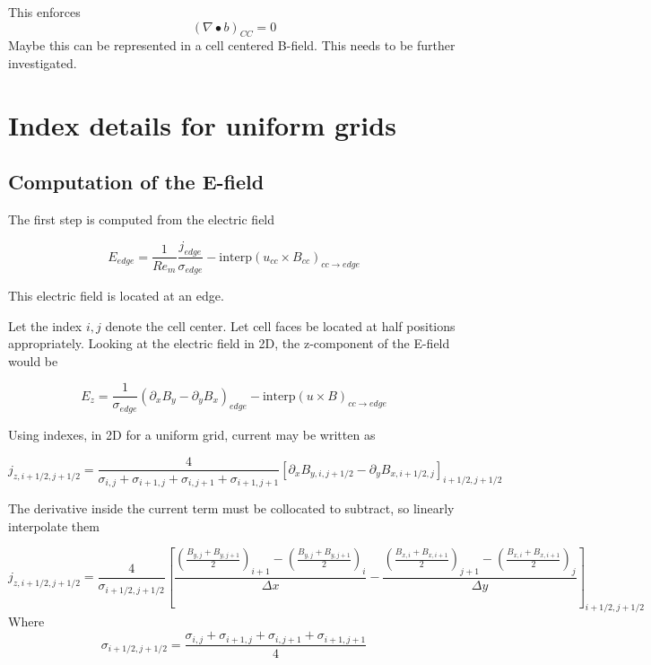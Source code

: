 \documentclass[11pt]{article}
\begin{document}
This enforces
\begin{equation}
	(\nabla \bullet b)_{CC} = 0
\end{equation}
Maybe this can be represented in a cell centered B-field. This needs to be further investigated.


\section{Index details for uniform grids}

\subsection{Computation of the E-field}
The first step is computed from the electric field

\begin{equation}
	E_{edge} = \frac{1}{Re_m} \frac{j_{edge}}{\sigma_{edge}} - \text{interp}(u_{cc} \times B_{cc})_{cc \rightarrow edge}
\end{equation}

This electric field is located at an edge.

Let the index $i,j$ denote the cell center. Let cell faces be located at half positions appropriately. Looking at the electric field in 2D, the z-component of the E-field would be

\begin{equation}
	E_z = \frac{1}{\sigma_{edge}}
	(\partial_x B_y - \partial_y B_x)_{edge} - 
	\text{interp} (u \times B)_{cc \rightarrow edge}
\end{equation}

Using indexes, in 2D for a uniform grid, current may be written as

\begin{equation}
	j_{z,i+1/2,j+1/2} = 
	\frac{4}{\sigma_{i,j} + \sigma_{i+1,j} + \sigma_{i,j+1} + \sigma_{i+1,j+1}}
	\left[
	\partial_x B_{y,i,j+1/2} - \partial_y B_{x,i+1/2,j}
	\right]_{i+1/2,j+1/2}
\end{equation}

The derivative inside the current term must be collocated to subtract, so linearly interpolate them

\begin{equation}
	j_{z,i+1/2,j+1/2} = 
	\frac{4}{\sigma_{i+1/2,j+1/2}}
	\left[
	\frac{ 
	\left(\frac{B_{y,j}+B_{y,j+1}}{2}\right)_{i+1}-\left(\frac{B_{y,j}+B_{y,j+1}}{2}\right)_{i}
	 }{\Delta x}
	-
	\frac{
	\left(\frac{B_{x,i}+B_{x,i+1}}{2}\right)_{j+1}-\left(\frac{B_{x,i}+B_{x,i+1}}{2}\right)_{j}
	}{\Delta y}
	\right]_{i+1/2,j+1/2}
\end{equation}
Where
\begin{equation}
	\sigma_{i+1/2,j+1/2} = 
	\frac{\sigma_{i,j} + \sigma_{i+1,j} + \sigma_{i,j+1} + \sigma_{i+1,j+1}}{4}
\end{equation}
\end{document}
